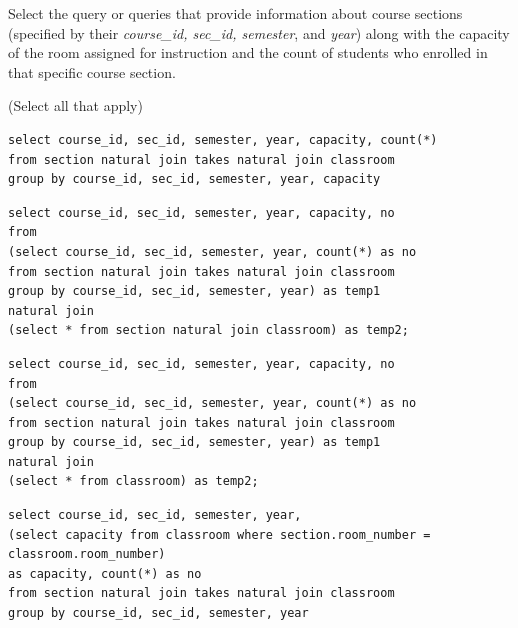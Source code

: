 \documentclass[12pt, addpoints, answers]{exam}
\begin{document}
\begin{questions}
\begin{minipage}{\linewidth}
\question[8]
Select the query or queries that provide information about course sections (specified by their \textit{course\_id, sec\_id, semester}, and \textit{year}) 
along with the capacity of the room assigned for instruction and the count of students who enrolled in that specific course section.\par\vspace{0.5em}
(Select all that apply)\par\vspace{0.5em}
\begin{checkboxes} 
    \CorrectChoice \begin{verbatim}
select course_id, sec_id, semester, year, capacity, count(*)
from section natural join takes natural join classroom
group by course_id, sec_id, semester, year, capacity
    \end{verbatim}
    \CorrectChoice \begin{verbatim}
select course_id, sec_id, semester, year, capacity, no
from
(select course_id, sec_id, semester, year, count(*) as no
from section natural join takes natural join classroom
group by course_id, sec_id, semester, year) as temp1 
natural join
(select * from section natural join classroom) as temp2;
    \end{verbatim}
    \choice \begin{verbatim}
select course_id, sec_id, semester, year, capacity, no
from
(select course_id, sec_id, semester, year, count(*) as no
from section natural join takes natural join classroom
group by course_id, sec_id, semester, year) as temp1 
natural join
(select * from classroom) as temp2;
    \end{verbatim}
    \choice \begin{verbatim}
select course_id, sec_id, semester, year, 
(select capacity from classroom where section.room_number = classroom.room_number) 
as capacity, count(*) as no
from section natural join takes natural join classroom
group by course_id, sec_id, semester, year
    \end{verbatim}
\end{checkboxes}
\end{minipage}\vspace{1em}


\end{questions}
\end{document}
